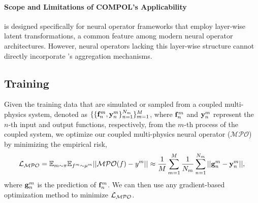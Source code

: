 \paragraph{Scope and Limitations of COMPOL’s Applicability} \ours is designed specifically for neural operator frameworks that employ layer-wise latent transformations, a common feature among modern neural operator architectures. However, neural operators lacking this layer-wise structure cannot directly incorporate \ours’s aggregation mechanisms.
\subsection{Training}
Given the training data that are simulated or sampled from a coupled multi-physics system, denoted as $\{\{{\bf f}_n^m, {\bf y}_n^m\}_{n=1}^{N_m}\}_{m=1}^M$, where ${\bf f}_n^m$ and ${\bf y}_n^m$ represent the $n$-th input and output functions, respectively, from the $m$-th process of the coupled system, we optimize our coupled multi-physics neural operator ($\mathcal{MPO}$) by minimizing the empirical risk,
\begin{align}
	\mathcal{L}_{\mathcal{MPO}} = \mathbb{E}_{m\sim\pi}\mathbb{E}_{f^m\sim\mu^m}||\mathcal{MPO}(f)-y^m|| \notag \approx \frac{1}{M}\sum_{m=1}^M\frac{1}{N_m}\sum_{n=1}^{N_m}||{\bf g}^m_n-{\bf y}_n^m||\notag,
\end{align}
where ${\bf g}_n^m$ is the prediction of ${\bf f}^m_n$. We can then use any gradient-based optimization method to minimize $\mathcal{L}_{\mathcal{MPO}}$.
















